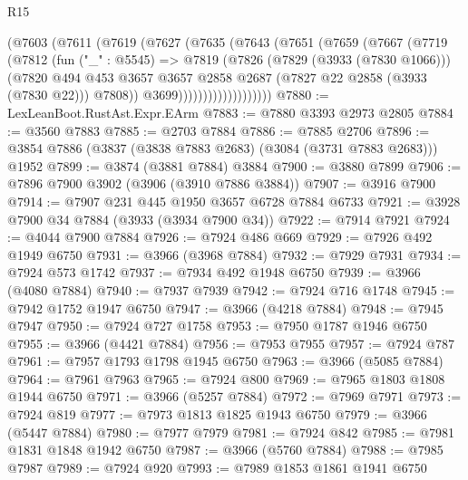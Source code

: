 \begin{lexlean}{R15}
\begin{coremodule}
                  (@7603
                    (@7611
                      (@7619
                        (@7627
                          (@7635
                            (@7643
                              (@7651
                                (@7659
                                  (@7667
                                    (@7719
                                      (@7812
                                        (fun ("_" : @5545) =>
                                        @7819
                                          (@7826
                                            (@7829 (@3933 (@7830 @1066)))
                                            (@7820
                                              @494
                                              @453
                                              @3657
                                              @3657
                                              @2858
                                              @2687
                                              (@7827 @22 @2858 (@3933 (@7830 @22)))
                                              @7808))
                                          @3699)))))))))))))))))))
@7880 := LexLeanBoot.RustAst.Expr.EArm
@7883 := @7880 @3393 @2973 @2805
@7884 := @3560 @7883
@7885 := @2703 @7884
@7886 := @7885 @2706
@7896 := @3854 @7886 (@3837 (@3838 @7883 @2683) (@3084 (@3731 @7883 @2683))) @1952
@7899 := @3874 (@3881 @7884) @3884
@7900 := @3880 @7899
@7906 := @7896 @7900 @3902 (@3906 (@3910 @7886 @3884))
@7907 := @3916 @7900
@7914 := @7907 @231 @445 @1950 @3657 @6728 @7884 @6733
@7921 := @3928 @7900 @34 @7884 (@3933 (@3934 @7900 @34))
@7922 := @7914 @7921
@7924 := @4044 @7900 @7884
@7926 := @7924 @486 @669
@7929 := @7926 @492 @1949 @6750
@7931 := @3966 (@3968 @7884)
@7932 := @7929 @7931
@7934 := @7924 @573 @1742
@7937 := @7934 @492 @1948 @6750
@7939 := @3966 (@4080 @7884)
@7940 := @7937 @7939
@7942 := @7924 @716 @1748
@7945 := @7942 @1752 @1947 @6750
@7947 := @3966 (@4218 @7884)
@7948 := @7945 @7947
@7950 := @7924 @727 @1758
@7953 := @7950 @1787 @1946 @6750
@7955 := @3966 (@4421 @7884)
@7956 := @7953 @7955
@7957 := @7924 @787
@7961 := @7957 @1793 @1798 @1945 @6750
@7963 := @3966 (@5085 @7884)
@7964 := @7961 @7963
@7965 := @7924 @800
@7969 := @7965 @1803 @1808 @1944 @6750
@7971 := @3966 (@5257 @7884)
@7972 := @7969 @7971
@7973 := @7924 @819
@7977 := @7973 @1813 @1825 @1943 @6750
@7979 := @3966 (@5447 @7884)
@7980 := @7977 @7979
@7981 := @7924 @842
@7985 := @7981 @1831 @1848 @1942 @6750
@7987 := @3966 (@5760 @7884)
@7988 := @7985 @7987
@7989 := @7924 @920
@7993 := @7989 @1853 @1861 @1941 @6750

\end{coremodule}
\end{lexlean}
